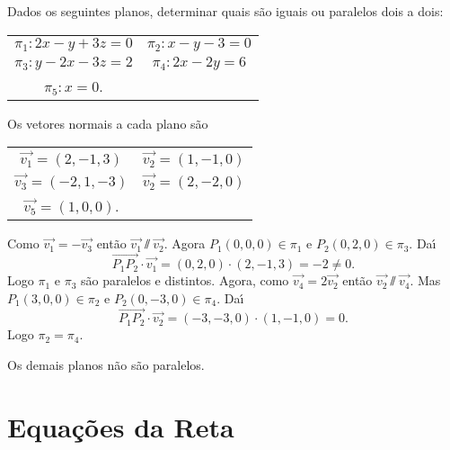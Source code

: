 \begin{exemplo}
    Dados os seguintes planos, determinar quais s\~ao iguais ou paralelos dois a dois:
    \begin{center}
        \begin{tabular}{cc}
            $\pi_1 : 2x - y + 3z = 0$ & 
            $\pi_2 : x - y - 3 = 0$\\
            $\pi_3 : y - 2x - 3z = 2$ & $\pi_4 : 2x - 2y = 6$\\
            $\pi_5 : x = 0$.
        \end{tabular}
    \end{center}
    \begin{solucao}
        Os vetores normais a cada plano s\~ao
        \begin{center}
            \begin{tabular}{cc}
                $\vec{v_1} = (2, -1, 3)$ & $\vec{v_2} = (1,-1,0)$\\
                $\vec{v_3} = (-2, 1, -3)$ & $\vec{v_2} = (2,-2,0)$\\
                $\vec{v_5} = (1, 0, 0)$.
            \end{tabular}
        \end{center}
        Como $\vec{v_1} = -\vec{v_3}$ ent\~ao $\vec{v_1}\varparallel\vec{v_2}$. Agora $P_1(0,0,0)\in\pi_1$ e $P_2(0,2,0)\in\pi_3$. Da{\'\i}
        \[
            \vec{P_1P_2}\cdot\vec{v_1} = (0,2,0)\cdot(2,-1,3) = -2 \ne 0.
        \]
        Logo $\pi_1$ e $\pi_3$ s\~ao paralelos e distintos.
        Agora, como $\vec{v_4} = 2\vec{v_2}$ ent\~ao $\vec{v_2}\varparallel\vec{v_4}$. Mas $P_1(3,0,0)\in\pi_2$ e $P_2(0,-3,0)\in\pi_4$. Da{\'\i}
        \[
            \vec{P_1P_2}\cdot\vec{v_2} = (-3,-3,0)\cdot(1,-1,0) = 0.
        \]
        Logo $\pi_2 =\pi_4$.

        Os demais planos n\~ao s\~ao paralelos.
    \end{solucao}
\end{exemplo}


\section{Equa\c{c}\~oes da Reta} %
\label{sec:equacoes_da_reta}

